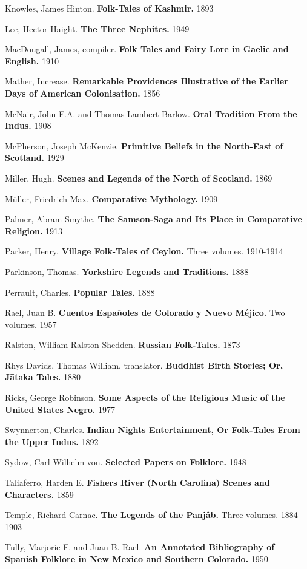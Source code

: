 \documentclass[14pt,a4paper]{memoir}
\begin{document}
Knowles, James Hinton. \textbf{Folk-Tales of Kashmir.} 1893

Lee, Hector Haight. \textbf{The Three Nephites.} 1949

MacDougall, James, compiler. \textbf{Folk Tales and Fairy Lore in Gaelic
and English.} 1910

Mather, Increase. \textbf{Remarkable Providences Illustrative of the
Earlier Days of American Colonisation.} 1856

McNair, John F.A. and Thomas Lambert Barlow. \textbf{Oral Tradition From
the Indus.} 1908

McPherson, Joseph McKenzie. \textbf{Primitive Beliefs in the North-East
of Scotland.} 1929

Miller, Hugh. \textbf{Scenes and Legends of the North of Scotland.} 1869

Müller, Friedrich Max. \textbf{Comparative Mythology.} 1909

Palmer, Abram Smythe. \textbf{The Samson-Saga and Its Place in
Comparative Religion.} 1913

Parker, Henry. \textbf{Village Folk-Tales of Ceylon.} Three volumes.
1910-1914

Parkinson, Thomas. \textbf{Yorkshire Legends and Traditions.} 1888

Perrault, Charles. \textbf{Popular Tales.} 1888

Rael, Juan B. \textbf{Cuentos Españoles de Colorado y Nuevo Méjico.} Two
volumes. 1957

Ralston, William Ralston Shedden. \textbf{Russian Folk-Tales.} 1873

Rhys Davids, Thomas William, translator. \textbf{Buddhist Birth Stories;
Or, Jātaka Tales.} 1880

Ricks, George Robinson. \textbf{Some Aspects of the Religious Music of
the United States Negro.} 1977

Swynnerton, Charles. \textbf{Indian Nights\textquotesingle{}
Entertainment, Or Folk-Tales From the Upper Indus.} 1892

Sydow, Carl Wilhelm von. \textbf{Selected Papers on Folklore.} 1948

Taliaferro, Harden E. \textbf{Fisher\textquotesingle s River (North
Carolina) Scenes and Characters.} 1859

Temple, Richard Carnac. \textbf{The Legends of the Panjâb.} Three
volumes. 1884-1903

Tully, Marjorie F. and Juan B. Rael. \textbf{An Annotated Bibliography
of Spanish Folklore in New Mexico and Southern Colorado.} 1950
\end{document}
